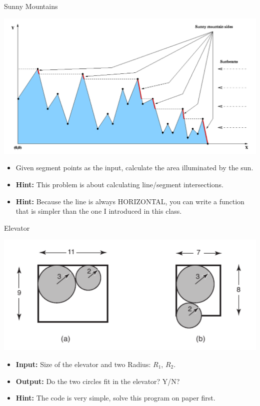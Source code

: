 \begin{frame}{Sunny Mountains}
  \begin{center}
    \includegraphics[width=.7\textwidth]{../img/problem_sunnyside}
  \end{center}
  \begin{itemize}
    \item Given segment points as the input, calculate the area illuminated by the sun.\bigskip

    \item {\bf Hint:} This problem is about calculating line/segment intersections.
    \item {\bf Hint:} Because the line is always HORIZONTAL, you can write a function that is simpler than the one I introduced in this class.
  \end{itemize}
\end{frame}

\begin{frame}{Elevator}
  \begin{center}
    \includegraphics[width=.7\textwidth]{../img/problem_elevator}
  \end{center}
  \begin{itemize}
    \item {\bf Input:} Size of the elevator and two Radius: $R_1$, $R_2$.
    \item {\bf Output:} Do the two circles fit in the elevator? Y/N?
    \item {\bf Hint:} The code is very simple, solve this program on paper first.
  \end{itemize}
\end{frame}

